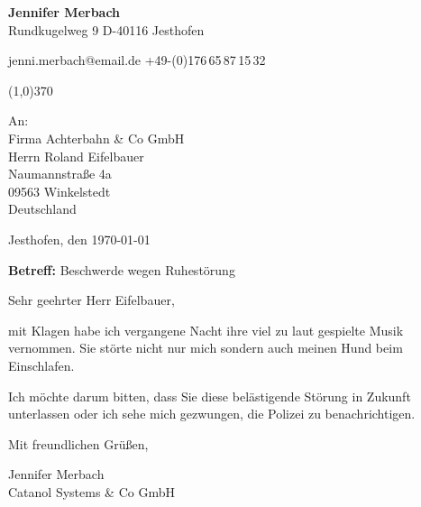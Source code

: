 \documentclass[a4paper,parskip=half,fontsize=11pt,DIV=calc]{scrartcl}
\begin{document}
\thispagestyle{empty}

\ttfamily

\begin{center}
{\large \textbf{\LARGE Jennifer Merbach} \\\smallskip
Rundkugelweg 9 \starredbullet{} D-40116 Jesthofen \\\smallskip

\Email{} jenni.merbach@email.de \starredbullet {} \Mobilefone{} +49-(0)176\,65\,87\,15\,32}

\line(1,0){370}

\end{center}

\vspace*{15mm}

\raggedright

An: \\
Firma Achterbahn \& Co GmbH \\
Herrn Roland Eifelbauer \\
Naumannstraße 4a \\
09563 Winkelstedt \\
Deutschland

\vspace*{1cm}

Jesthofen, den \today

\vspace*{5mm}

\textbf{Betreff:} Beschwerde wegen Ruhestörung

\vspace*{10mm}

Sehr geehrter Herr Eifelbauer, \medskip

mit Klagen habe ich vergangene Nacht ihre viel zu laut gespielte Musik vernommen. Sie störte nicht nur mich sondern auch meinen Hund beim Einschlafen.

Ich möchte darum bitten, dass Sie diese belästigende Störung in Zukunft unterlassen oder ich sehe mich gezwungen, die Polizei zu benachrichtigen.

\vspace*{5mm}

Mit freundlichen Grüßen,

\vspace*{15mm}

Jennifer Merbach \\
Catanol Systems \& Co GmbH
\end{document}

